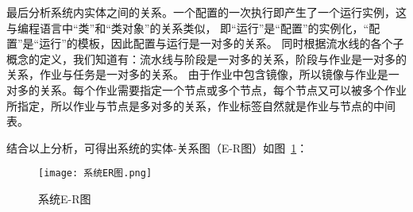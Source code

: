 最后分析系统内实体之间的关系。一个配置的一次执行即产生了一个运行实例，这与编程语言中“类”和“类对象”的关系类似，
即“运行”是“配置”的实例化，“配置”是“运行”的模板，因此配置与运行是一对多的关系。
同时根据流水线的各个子概念的定义，我们知道有：流水线与阶段是一对多的关系，阶段与作业是一对多的关系，作业与任务是一对多的关系。
由于作业中包含镜像，所以镜像与作业是一对多的关系。每个作业需要指定一个节点或多个节点，每个节点又可以被多个作业所指定，所以作业与节点是多对多的关系，作业标签自然就是作业与节点的中间表。

结合以上分析，可得出系统的实体-关系图（E-R图）如图~\ref{fig:系统E-R图}：

\begin{figure}[h]
  \centering
  \texttt{[image: 系统ER图.png]}
  \caption{系统E-R图}
  \label{fig:系统E-R图}
\end{figure}


